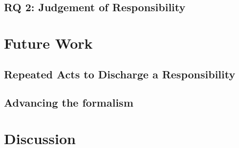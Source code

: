 \subsection{RQ 2: Judgement of Responsibility}



\section{Future Work}

\subsection{Repeated Acts to Discharge a Responsibility}

\subsection{Advancing the formalism}


\section{Discussion}





